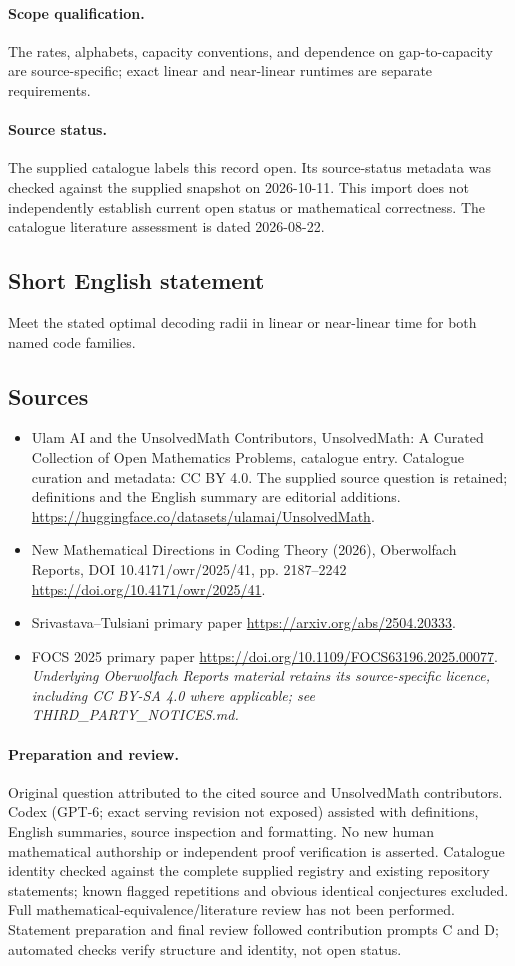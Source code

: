 \documentclass[11pt]{article}
\begin{document}
\paragraph{Scope qualification.}
The rates, alphabets, capacity conventions, and dependence on gap-to-capacity are source-specific; exact linear and near-linear runtimes are separate requirements.
\paragraph{Source status.}
The supplied catalogue labels this record open. Its source-status metadata was checked against the supplied snapshot on 2026-10-11. This import does not independently establish current open status or mathematical correctness. The catalogue literature assessment is dated 2026-08-22.
\subsection{Short English statement}
Meet the stated optimal decoding radii in linear or near-linear time for both named code families.
\subsection{Sources}
\begin{itemize}
\item[S1] Ulam AI and the UnsolvedMath Contributors, UnsolvedMath: A Curated Collection of Open Mathematics Problems, catalogue entry. Catalogue curation and metadata: CC BY 4.0. The supplied source question is retained; definitions and the English summary are editorial additions.
\url{https://huggingface.co/datasets/ulamai/UnsolvedMath}.
\item[S2] New Mathematical Directions in Coding Theory (2026), Oberwolfach Reports, DOI 10.4171/owr/2025/41, pp. 2187--2242
\url{https://doi.org/10.4171/owr/2025/41}.
\item[S3] Srivastava--Tulsiani primary paper
\url{https://arxiv.org/abs/2504.20333}.
\item[S4] FOCS 2025 primary paper
\url{https://doi.org/10.1109/FOCS63196.2025.00077}.
\textit{Underlying Oberwolfach Reports material retains its source-specific licence, including CC BY-SA 4.0 where applicable; see THIRD\_PARTY\_NOTICES.md.}
\end{itemize}
\paragraph{Preparation and review.}
Original question attributed to the cited source and UnsolvedMath contributors. Codex (GPT-6; exact serving revision not exposed) assisted with definitions, English summaries, source inspection and formatting. No new human mathematical authorship or independent proof verification is asserted. Catalogue identity checked against the complete supplied registry and existing repository statements; known flagged repetitions and obvious identical conjectures excluded. Full mathematical-equivalence/literature review has not been performed. Statement preparation and final review followed contribution prompts C and D; automated checks verify structure and identity, not open status.
\label{end:statement}
\end{document}
